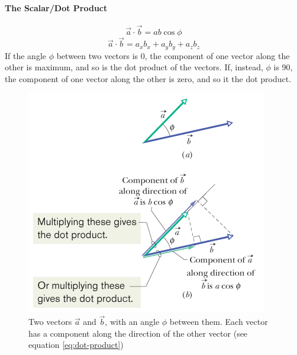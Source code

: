 \documentclass{article}
\begin{document}
        \paragraph{The Scalar/Dot Product}
        \begin{equation} \label{eq:dot-product}
            \vec{a} \cdot \vec{b} = ab \cos{\phi}
        \end{equation}
        \begin{equation}
            \vec{a} \cdot \vec{b} = a_x b_x + a_y b_y + a_z b_z
        \end{equation}
        If the angle $\phi$ between two vectors is 0\degree, the component of one vector along the other is maximum, and so is the dot product of the vectors. If, instead, $\phi$ is 90\degree, the component of one vector along the other is zero, and so it the dot product.
        \begin{figure}[H]
            \centering
            \includegraphics[scale=0.6]{dot-product}
            \caption{Two vectors $\vec{a}$ and $\vec{b}$, with an angle $\phi$ between them. Each vector has a component along the direction of the other vector (see equation \ref{eq:dot-product})}
        \end{figure}
\end{document}
